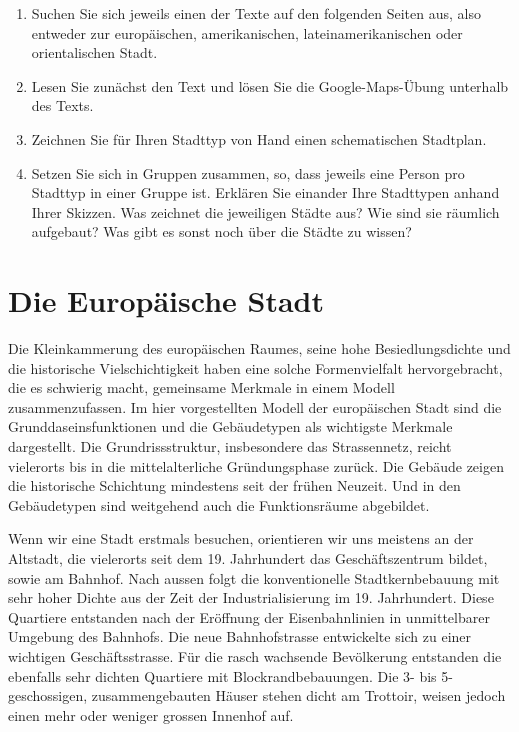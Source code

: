 \begin{myexercise}
\begin{enumerate}
\item Suchen Sie sich jeweils einen der Texte auf den folgenden Seiten aus, also entweder zur europäischen, amerikanischen, lateinamerikanischen oder orientalischen Stadt. 
\item Lesen Sie zunächst den Text und lösen Sie die Google-Maps-Übung unterhalb des Texts.
\item Zeichnen Sie für Ihren Stadttyp von Hand einen schematischen Stadtplan.
\item Setzen Sie sich in Gruppen zusammen, so, dass jeweils eine Person pro Stadttyp in einer Gruppe ist. Erklären Sie einander Ihre Stadttypen anhand Ihrer Skizzen. Was zeichnet die jeweiligen Städte aus? Wie sind sie räumlich aufgebaut? Was gibt es sonst noch über die Städte zu wissen?
\end{enumerate}
\end{myexercise}
\section{Die Europäische Stadt}
Die Kleinkammerung des europäischen Raumes, seine hohe Besiedlungsdichte und die historische Vielschichtigkeit haben eine solche Formenvielfalt hervorgebracht, die es schwierig macht, gemeinsame Merkmale in einem Modell zusammenzufassen.
Im hier vorgestellten Modell der europäischen Stadt sind die Grunddaseinsfunktionen und die Gebäudetypen als wichtigste Merkmale dargestellt. Die Grundrissstruktur, insbesondere das Stras­sennetz, reicht vielerorts bis in die mittelalterliche Gründungsphase zurück. Die Gebäude zeigen die historische Schichtung mindestens seit der frühen Neuzeit. Und in den Gebäudetypen sind weitgehend auch die Funktionsräume abgebildet.

Wenn wir eine Stadt erstmals besuchen, orientieren wir uns meistens an der Altstadt, die vielerorts seit dem 19. Jahrhundert das Geschäftszentrum bildet, sowie am Bahnhof. Nach aussen folgt die konventionelle Stadtkernbebauung mit sehr hoher Dichte aus der Zeit der Industrialisierung im 19. Jahrhundert. Diese Quartiere entstanden nach der Eröffnung der Eisenbahnlinien in unmittelbarer Umgebung des Bahnhofs. Die neue Bahnhofstrasse entwickelte sich zu einer wichtigen Geschäftsstrasse. Für die rasch wachsende Bevölkerung entstanden die ebenfalls sehr dichten Quartiere mit Blockrandbebauungen. Die 3- bis 5-geschossigen, zusammengebauten Häuser stehen dicht am Trottoir, weisen jedoch einen mehr oder weniger grossen Innenhof auf.

